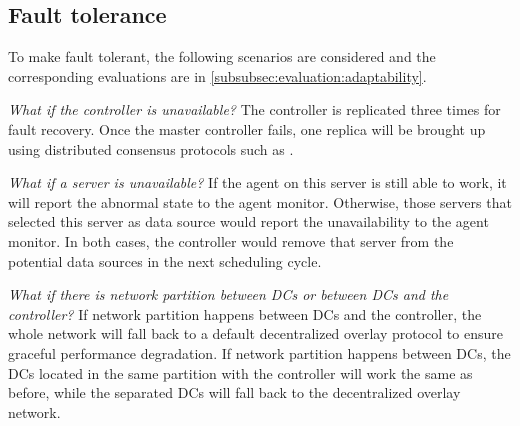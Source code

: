 

\subsection{Fault tolerance}
\label{subsec:system:fault}
To make \name fault tolerant, the following scenarios are considered and the corresponding evaluations are in \Section\ref{subsubsec:evaluation:adaptability}.

\begin{packedenumerate}
\item \emph{What if the controller is unavailable?} The controller is replicated three times for fault recovery. Once the master controller fails, one replica will be brought up using distributed consensus protocols such as \cite{lamport1998part}.
\item \emph{What if a server is unavailable?} If the agent on this server is still able to work, it will report the abnormal state to the agent monitor. Otherwise, those servers that selected this server as data source would report the unavailability to the agent monitor. In both cases, the controller would remove that server from the potential data sources in the next scheduling cycle.
\item \emph{What if there is network partition between DCs or between DCs and the controller?} If network partition happens between DCs and the controller, the whole network will fall back to a default decentralized overlay protocol to ensure graceful performance degradation. If network partition happens between DCs, the DCs located in the same partition with the controller will work the same as before, while the separated DCs will fall back to the decentralized overlay network.
\end{packedenumerate}
%
%
%
%
%



